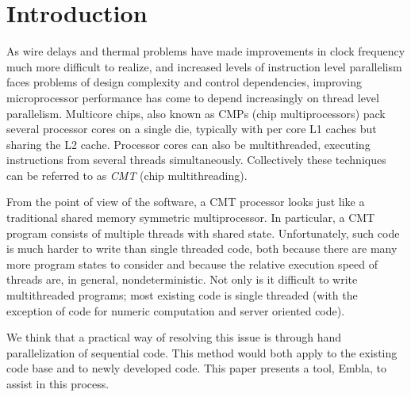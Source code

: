 %

\section{Introduction}

As wire delays and thermal problems have made improvements in clock
frequency much more difficult to realize, and increased levels of
instruction level parallelism faces problems of design complexity and
control dependencies, improving microprocessor performance has come to
depend increasingly on thread level parallelism. Multicore chips, also
known as CMPs (chip multiprocessors) pack several processor cores on a
single die, typically with per core L1 caches but sharing the L2
cache. Processor cores can also be multithreaded, executing
instructions from several threads simultaneously. Collectively 
these techniques can be referred to as {\em CMT} (chip multithreading).

From the point of view of the software, a CMT processor looks just
like a traditional shared memory symmetric multiprocessor. In particular, a CMT
program consists of multiple threads with shared state. 
Unfortunately, such code is much
harder to write than single threaded code, both because there are many
more program states to consider and because the relative execution
speed of threads are, in general, nondeterministic.  Not only is it
difficult to write multithreaded programs; most existing code is
single threaded (with the exception of code for numeric computation
and server oriented code).

We think that a practical way of resolving this issue is through hand
parallelization of sequential code. This method would both apply to
the existing code base and to newly developed code. This paper
presents a tool, Embla, to assist in this process.


